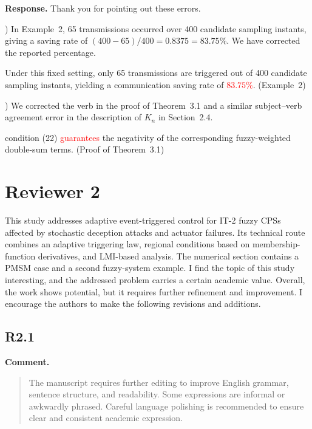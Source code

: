 \documentclass[12pt,a4paper]{article}
\begin{document}
\begingroup
\setlength{\parskip}{3pt}
\textbf{Response.}
Thank you for pointing out these errors.\par
{}) In Example~2, 65 transmissions occurred over 400 candidate sampling instants, giving a saving rate of $(400-65)/400=0.8375=83.75\%$. We have corrected the reported percentage.\par\nopagebreak
\noindent Under this fixed setting, only 65 transmissions are triggered out of 400 candidate sampling instants, yielding a communication saving rate of \textcolor{red}{$83.75\%$}. (Example~2)\par
{}) We corrected the verb in the proof of Theorem~3.1 and a similar subject--verb agreement error in the description of $K_n$ in Section~2.4.\par\nopagebreak
\noindent condition (22) \textcolor{red}{guarantees} the negativity of the corresponding fuzzy-weighted double-sum terms. (Proof of Theorem~3.1)\par
\endgroup

\clearpage

\section*{Reviewer 2}

This study addresses adaptive event-triggered control for IT-2 fuzzy CPSs affected by stochastic deception attacks and actuator failures. Its technical route combines an adaptive triggering law, regional conditions based on membership-function derivatives, and LMI-based analysis. The numerical section contains a PMSM case and a second fuzzy-system example. I find the topic of this study interesting, and the addressed problem carries a certain academic value. Overall, the work shows potential, but it requires further refinement and improvement. I encourage the authors to make the following revisions and additions.

\subsection*{R2.1}

\textbf{Comment.}
\begin{quote}
\raggedright
The manuscript requires further editing to improve English grammar, sentence structure, and readability. Some expressions are informal or awkwardly phrased. Careful language polishing is recommended to ensure clear and consistent academic expression.
\end{quote}
\end{document}

